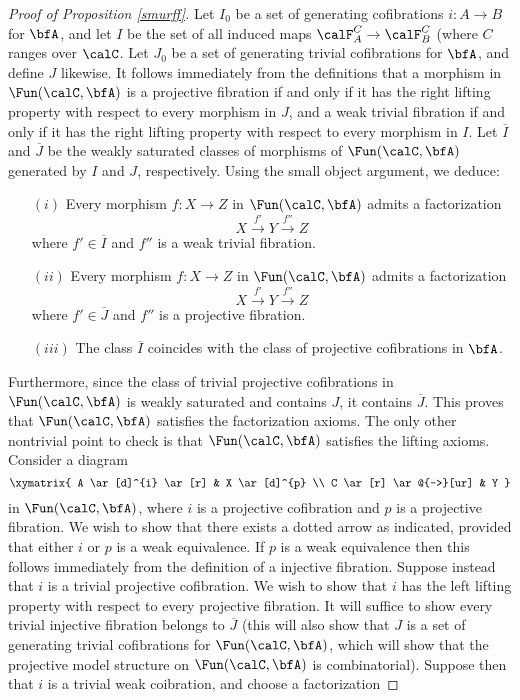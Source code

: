 \begin{Model Categories}
\begin{Didn't Read}
\begin{proof}[Proof of Proposition \ref{smurff}]
Let $I_0$ be a set of generating cofibrations $i: A \rightarrow B$ for $\bfA$, and let $I$ be the set of all induced maps $\calF^{C}_{A} \rightarrow \calF^{C}_{B}$ (where $C$ ranges over $\calC$. Let $J_0$ be a set of generating trivial cofibrations for $\bfA$, and define 
$J$ likewise. It follows immediately from the definitions that a morphism in $\Fun(\calC, \bfA)$ is a projective fibration if and only if it has the right lifting property with respect to every morphism in $J$, and a weak trivial fibration if and only if it has the right lifting property with respect to every morphism in $I$. Let $\overline{I}$ and $\overline{J}$ be the weakly saturated classes of morphisms of $\Fun(\calC, \bfA)$ generated by $I$ and $J$, respectively. Using the small object argument, we deduce:
\begin{itemize}
\item[$(i)$] Every morphism $f: X \rightarrow Z$ in $\Fun(\calC, \bfA)$ admits a factorization
$$ X \stackrel{f'}{\rightarrow} Y \stackrel{f''}{\rightarrow} Z$$
where $f' \in \overline{I}$ and $f''$ is a weak trivial fibration.
\item[$(ii)$] Every morphism $f: X \rightarrow Z$ in $\Fun(\calC, \bfA)$ admits a factorization
$$ X \stackrel{f'}{\rightarrow} Y \stackrel{f''}{\rightarrow} Z$$
where $f' \in \overline{J}$ and $f''$ is a projective fibration. 
\item[$(iii)$] The class $\overline{I}$ coincides with the class of projective cofibrations in $\bfA$.
\end{itemize}
Furthermore, since the class of trivial projective cofibrations in $\Fun(\calC, \bfA)$ is weakly saturated and contains $J$, it contains $\overline{J}$. This proves that $\Fun(\calC, \bfA)$ satisfies the factorization axioms. The only other nontrivial point to check is that $\Fun(\calC, \bfA)$ satisfies the lifting axioms. Consider a diagram
$$ \xymatrix{ A \ar[d]^{i} \ar[r] & X \ar[d]^{p} \\
C \ar[r] \ar@{-->}[ur] & Y }$$
in $\Fun(\calC, \bfA)$, where $i$ is a projective cofibration and $p$ is a projective fibration. We wish to show that there exists a dotted arrow as indicated, provided that either $i$ or $p$ is a weak equivalence.
If $p$ is a weak equivalence then this follows immediately from the definition of a injective fibration.
Suppose instead that $i$ is a trivial projective cofibration. We wish to show that $i$ has the left lifting property with respect to every projective fibration. It will suffice to show every trivial injective fibration belongs to $\overline{J}$ (this will also show that $J$ is a set of generating trivial cofibrations for $\Fun(\calC, \bfA)$, which will show that the projective model structure on $\Fun(\calC, \bfA)$ is combinatorial). Suppose then that $i$ is a trivial weak coibration, and choose a factorization

\end{proof}
\end{Didn't Read}
\end{Model Categories}
